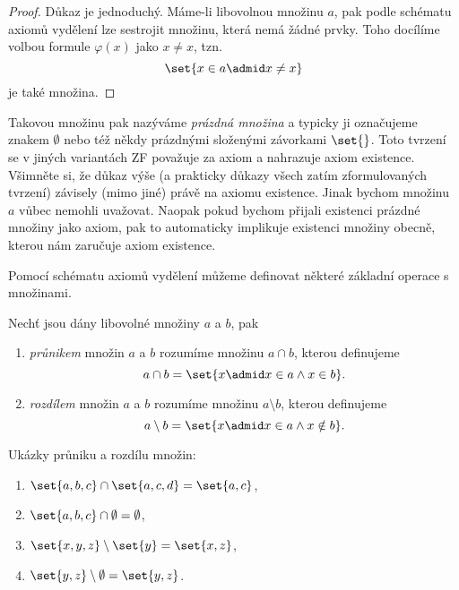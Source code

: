 \begin{proof}
    Důkaz je jednoduchý. Máme-li libovolnou množinu $a$, pak podle schématu axiomů vydělení lze sestrojit množinu, která nemá žádné prvky. Toho docílíme volbou formule $\varphi(x)$ jako $x\neq x$, tzn.
    \begin{equation*}
        \set{x\in a \admid x\neq x}
    \end{equation*}
    je také množina.
\end{proof}
Takovou množinu pak nazýváme \emph{prázdná množina} a typicky ji označujeme znakem $\emptyset$ nebo též někdy prázdnými složenými závorkami $\set{}$. Toto tvrzení se v jiných variantách ZF považuje za axiom a nahrazuje axiom existence. Všimněte si, že důkaz výše (a prakticky důkazy všech zatím zformulovaných tvrzení) závisely (mimo jiné) právě na axiomu existence. Jinak bychom množinu $a$ vůbec nemohli uvažovat. Naopak pokud bychom přijali existenci prázdné množiny jako axiom, pak to automaticky implikuje existenci množiny obecně, kterou nám zaručuje axiom existence.\par
Pomocí schématu axiomů vydělení můžeme definovat některé základní operace s množinami.
\begin{definition}\label{def:prunik_rozdil}
    Nechť jsou dány libovolné množiny $a$ a $b$, pak
    \begin{enumerate}[label=(\roman*)]
        \item \emph{průnikem} množin $a$ a $b$ rozumíme množinu $a \cap b$, kterou definujeme
        \begin{equation*}
            a\cap b=\set{x \admid x\in a \land x\in b}.
        \end{equation*}
        \item \emph{rozdílem} množin $a$ a $b$ rozumíme množinu $a \setminus b$, kterou definujeme
        \begin{equation*}
            a\setminus b=\set{x \admid x\in a \land x\notin b}.
        \end{equation*}
    \end{enumerate}
\end{definition}
\begin{example}
    Ukázky průniku a rozdílu množin:
    \begin{enumerate}[label=(\roman*)]
        \item $\set{a,b,c}\cap\set{a,c,d}=\set{a,c}$,
        \item $\set{a,b,c}\cap\emptyset=\emptyset$,
        \item $\set{x,y,z}\setminus\set{y}=\set{x,z}$,
        \item $\set{y,z}\setminus\emptyset=\set{y,z}$.
    \end{enumerate}
\end{example}
